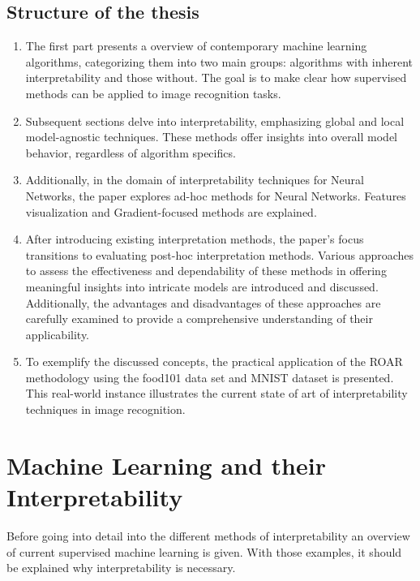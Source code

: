 \newpage
\section{Structure of the thesis}

\begin{enumerate}
	\item The first part presents a overview of contemporary machine learning algorithms, categorizing them into two main groups: algorithms with inherent interpretability and those without. The goal is to make clear how supervised methods can be applied to image recognition tasks.
	\item Subsequent sections delve into interpretability, emphasizing global and local model-agnostic techniques. These methods offer insights into overall model behavior, regardless of algorithm specifics.   
	\item Additionally, in the domain of interpretability techniques for Neural Networks, the paper explores ad-hoc methods for Neural Networks. Features visualization and Gradient-focused methods are explained.
	\item After introducing existing interpretation methods, the paper's focus transitions to evaluating post-hoc interpretation methods. Various approaches to assess the effectiveness and dependability of these methods in offering meaningful insights into intricate models are introduced and discussed. Additionally, the advantages and disadvantages of these approaches are carefully examined to provide a comprehensive understanding of their applicability.
	\item To exemplify the discussed concepts, the practical application of the ROAR methodology using the food101 data set \cite{bossard14} and MNIST dataset \cite{deng2012mnist} is presented. This real-world instance illustrates the current state of art of interpretability techniques in image recognition.
\end{enumerate}



\chapter{Machine Learning and their Interpretability}




Before going into detail into the different methods of interpretability an overview of current supervised machine learning is given. With those examples, it should be explained why interpretability is necessary.

